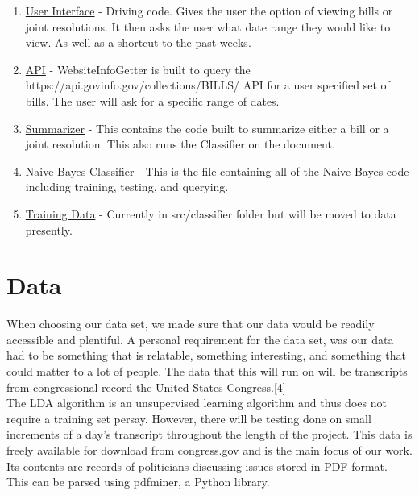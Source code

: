 \documentclass[11pt,a4paper]{article}
\begin{document}
\begin{enumerate}
    \item \href{https://gitlab.com/Merchant89/b/-/blob/master/src/Classifer/UserInterface.py}{User Interface} - Driving code. Gives the user the option of viewing bills or joint resolutions. It then asks the user what date range they would like to view. As well as a shortcut to the past weeks.
    \item \href{https://gitlab.com/Merchant89/b/-/blob/master/src/Classifer/WebsiteInfoGetter.py}{API} - WebsiteInfoGetter is built to query the https://api.govinfo.gov/collections/BILLS/ API for a user specified set of bills. The user will ask for a specific range of dates. 
    \item \href{https://gitlab.com/Merchant89/b/-/blob/master/src/Classifer/ResolutionSummarizer.py}{Summarizer} - This contains the code built to summarize either a bill or a joint resolution. This also runs the Classifier on the document. 
    \item \href{https://gitlab.com/Merchant89/b/-/blob/master/src/Classifer/NaiveClassifier.py}{Naive Bayes Classifier} - This is the file containing all of the Naive Bayes code including training, testing, and querying.
    \item \href{https://gitlab.com/Merchant89/b/-/tree/master/src/Classifer/train}{Training Data} - Currently in src/classifier folder but will be moved to data presently.
    
\end{enumerate}
\section{Data}

When choosing our data set, we made sure that our data would be readily accessible and plentiful. A personal requirement for the data set, was our data had to be something that is relatable, something interesting, and something that could matter to a lot of people. The data that this will run on will be transcripts from congressional-record the United States Congress.[4] \\
The LDA algorithm is an unsupervised learning algorithm and thus does not require a training set persay. However, there will be testing done on small increments of a day's transcript throughout the length of the project. This data is freely available for download from congress.gov and is the main focus of our work. Its contents are records of politicians discussing issues stored in PDF format. This can be parsed using pdfminer, a Python library.
\end{document}
